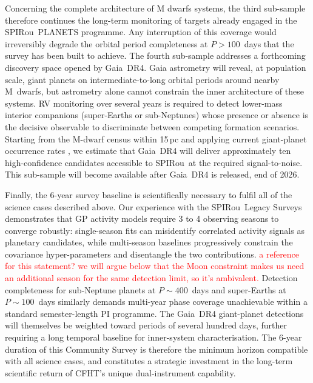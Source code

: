 \documentclass[
    traditabstract,
    longauth,
    onecolumn,
]{aa}
\def \spi{SPIRou}
\begin{document}
Concerning the complete architecture of M dwarfs systems, the third sub-sample therefore continues the long-term monitoring of targets already engaged in the \spi\ PLANETS programme.
Any interruption of this coverage would irreversibly degrade the orbital period completeness at $P > 100$~days that the survey has been built to achieve.
The fourth sub-sample addresses a forthcoming discovery space opened by Gaia~DR4. 
Gaia astrometry will reveal, at population scale, giant planets on intermediate-to-long orbital periods around nearby M~dwarfs, but astrometry alone cannot constrain the inner architecture of these systems.
RV monitoring over several years is required to detect lower-mass interior companions (super-Earths or sub-Neptunes) whose presence or absence is the decisive observable to discriminate between competing formation scenarios. 
Starting from the M-dwarf census within 15\,pc and applying current giant-planet occurrence rates \citep{Mignon2025}, we estimate that Gaia~DR4 will deliver approximately ten high-confidence candidates accessible to \spi\ at the required signal-to-noise.
This sub-sample will become available after Gaia~DR4 is released, end of 2026.


Finally, the 6-year survey baseline is scientifically necessary to fulfil all of the science cases described above.
Our experience with the \spi\ Legacy Surveys demonstrates that GP activity models require 3 to 4 observing seasons to converge robustly: single-season fits can misidentify correlated activity signals as planetary candidates, while multi-season baselines progressively constrain the covariance hyper-parameters and disentangle the two contributions. \textcolor{red}{a reference for this statement? we will argue below that the Moon constraint makes us need an additional season for the same detection limit, so it's ambivalent. }
Detection completeness for sub-Neptune planets at $P \sim 400$~days and super-Earths at $P \sim 100$~days similarly demands multi-year phase coverage unachievable within a standard semester-length PI programme.
The Gaia~DR4 giant-planet detections will themselves be weighted toward periods of several hundred days, further requiring a long temporal baseline for inner-system characterisation.
The 6-year duration of this Community Survey is therefore the minimum horizon compatible with all science cases, and constitutes a strategic investment in the long-term scientific return of CFHT's unique dual-instrument capability.
\end{document}
